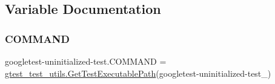 \subsection{Variable Documentation}
\mbox{\label{namespacegoogletest-uninitialized-test_a2526f9a60be6da67bfed64cac54d836b}} 
\subsubsection{\texorpdfstring{COMMAND}{COMMAND}}
{\footnotesize\ttfamily googletest-\/uninitialized-\/test.\+C\+O\+M\+M\+A\+ND = \mbox{\hyperlink{namespacegtest__test__utils_a89ed3717984a80ffbb7a9c92f71b86a2}{gtest\+\_\+test\+\_\+utils.\+Get\+Test\+Executable\+Path}}(\textquotesingle{}googletest-\/uninitialized-\/test\+\_\+\textquotesingle{})}

